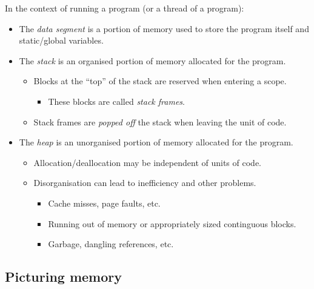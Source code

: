 \documentclass[11pt]{article}
\theoremstyle{definition}
\begin{document}
In the context of running a program (or a thread of a program):
\begin{itemize}
\item The \emph{data segment} is a portion of memory used to store the
program itself and static/global variables.
\item The \emph{stack} is an organised portion of memory allocated for the program.
\begin{itemize}
\item Blocks at the “top” of the stack are reserved when entering
a scope.
\begin{itemize}
\item These blocks are called \emph{stack frames}.
\end{itemize}
\item Stack frames are \emph{popped off} the stack when leaving the unit of code.
\end{itemize}
\item The \emph{heap} is an unorganised portion of memory allocated for the program.
\begin{itemize}
\item Allocation/deallocation may be independent of units of code.
\item Disorganisation can lead to inefficiency and other problems.
\begin{itemize}
\item Cache misses, page faults, etc.
\item Running out of memory or appropriately sized continguous blocks.
\item Garbage, dangling references, etc.
\end{itemize}
\end{itemize}
\end{itemize}

\subsection{Picturing memory}
\label{sec:org65c8e59}
\end{document}
